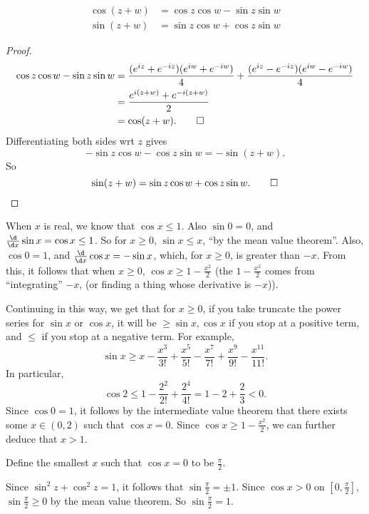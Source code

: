 \documentclass[a4paper]{article}
\begin{document}
\begin{prop}
  \begin{align*}
    \cos(z + w) &= \cos z\cos w - \sin z\sin w\\
    \sin(z + w) &= \sin z \cos w + \cos z \sin w
  \end{align*}
\end{prop}

\begin{proof}
  \begin{align*}
    \cos z\cos w - \sin z \sin w &= \frac{(e^{iz} + e^{-iz})(e^{iw} + e^{-iw})}{4} + \frac{(e^{iz} - e^{-iz})(e^{iw} - e^{-iw})}{4}\\
    &= \frac{e^{i(z + w)} + e^{-i(z + w)}}{2}\\
    &= \cos (z + w). \qedhere
  \end{align*}
  Differentiating both sides wrt $z$ gives
  \[
    -\sin z \cos w - \cos z \sin w = -\sin (z + w).
  \]
  So
  \[
    \sin(z + w) = \sin z\cos w + \cos z \sin w.\qedhere
  \]
\end{proof}
When $x$ is real, we know that $\cos x \leq 1$. Also $\sin 0 = 0$, and $\frac{\d }{\d x}\sin x = \cos x \leq 1$. So for $x \geq 0$, $\sin x \leq x$, ``by the mean value theorem''. Also, $\cos 0 = 1$, and $\frac{\d}{\d x}\cos x = -\sin x$, which, for $x \geq 0$, is greater than $-x$. From this, it follows that when $x \geq 0$, $\cos x \geq 1 - \frac{x^2}{2}$ (the $1 - \frac{x^2}{2}$ comes from ``integrating'' $-x$, (or finding a thing whose derivative is $-x$)).

Continuing in this way, we get that for $x \geq 0$, if you take truncate the power series for $\sin x$ or $\cos x$, it will be $\geq \sin x, \cos x$ if you stop at a positive term, and $\leq$ if you stop at a negative term. For example,
\[
  \sin x \geq x - \frac{x^3}{3!} + \frac{x^5}{5!} - \frac{x^7}{7!} + \frac{x^9}{9!} - \frac{x^{11}}{11!}.
\]
In particular,
\[
  \cos 2 \leq 1 - \frac{2^2}{2!} + \frac{2^4}{4!} = 1 - 2 + \frac{2}{3} < 0.
\]
Since $\cos 0 = 1$, it follows by the intermediate value theorem that there exists some $x\in (0, 2)$ such that $\cos x = 0$. Since $\cos x \geq 1 - \frac{x^2}{2}$, we can further deduce that $x > 1$.

\begin{defi}[Pi]
  Define the smallest $x$ such that $\cos x = 0$ to be $\frac{\pi}{2}$.
\end{defi}

Since $\sin^2 z + \cos ^2 z = 1$, it follows that $\sin \frac{\pi}{2} = \pm 1$. Since $\cos x > 0$ on $[0, \frac{\pi}{2}]$, $\sin \frac{\pi}{2} \geq 0$ by the mean value theorem. So $\sin \frac{\pi}{2} = 1$.
\end{document}
